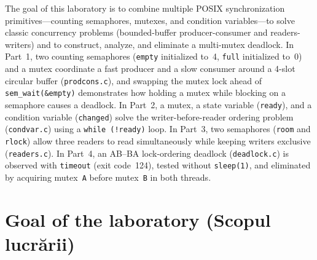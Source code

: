\documentclass{../latex/utmreport}
\begin{document}
\makeutmreporttitlepage
\tableofcontents
\clearpage
\begin{utmabstract}[Abstract]
The goal of this laboratory is to combine multiple POSIX synchronization primitives—counting semaphores, mutexes, and condition variables—to solve classic concurrency problems (bounded-buffer producer-consumer and readers-writers) and to construct, analyze, and eliminate a multi-mutex deadlock. In Part~1, two counting semaphores (\texttt{empty} initialized to~4, \texttt{full} initialized to~0) and a mutex coordinate a fast producer and a slow consumer around a 4-slot circular buffer (\texttt{prodcons.c}), and swapping the mutex lock ahead of \texttt{sem\_wait(\&empty)} demonstrates how holding a mutex while blocking on a semaphore causes a deadlock. In Part~2, a mutex, a state variable (\texttt{ready}), and a condition variable (\texttt{changed}) solve the writer-before-reader ordering problem (\texttt{condvar.c}) using a \texttt{while (!ready)} loop. In Part~3, two semaphores (\texttt{room} and \texttt{rlock}) allow three readers to read simultaneously while keeping writers exclusive (\texttt{readers.c}). In Part~4, an AB--BA lock-ordering deadlock (\texttt{deadlock.c}) is observed with \texttt{timeout} (exit code~124), tested without \texttt{sleep(1)}, and eliminated by acquiring mutex~\texttt{A} before mutex~\texttt{B} in both threads.
\end{utmabstract}
\utmintroduction

\section*{Goal of the laboratory (Scopul lucrării)}
\end{document}
